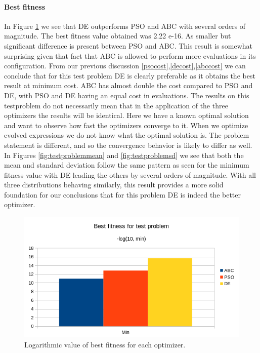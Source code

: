 \paragraph{Best fitness}
In Figure \ref{fig:testproblembest} we see that DE outperforms PSO and ABC with several orders of magnitude. The best fitness value obtained was 2.22 e-16. As smaller but significant difference is present between PSO and ABC. This result is somewhat surprising given that fact that ABC is allowed to perform more evaluations in its configuration. From our previous discussion \ref{psocost},\ref{decost},\ref{abccost} we can conclude that for this test problem DE is clearly preferable as it obtains the best result at minimum cost. ABC has almost double the cost compared to PSO and DE, with PSO and DE having an equal cost in evaluations. The results on this testproblem do not necessarily mean that in the application of the three optimizers the results will be identical. Here we have a known optimal solution and want to observe how fast the optimizers converge to it. When we optimize evolved expressions we do not know what the optimal solution is. The problem statement is different, and so the convergence behavior is likely to differ as well. In Figures \ref{fig:testproblemmean} and \ref{fig:testproblemsd} we see that both the mean and standard deviation follow the same pattern as seen for the minimum fitness value with DE leading the others by several orders of magnitude. With all three distributions behaving similarly, this result provides a more solid foundation for our conclusions that for this problem DE is indeed the better optimizer.
\begin{figure}
    \centering
    \includegraphics[width=\textwidth,height=\textheight,keepaspectratio]{figures/testproblem_bestfitness.png}
    \caption{Logarithmic value of best fitness for each optimizer.}
    \label{fig:testproblembest}
\end{figure}
